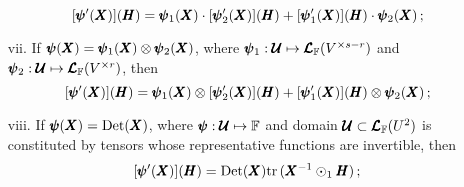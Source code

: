 \begin{itemize}
	\begin{equation}
	[\pmb{\psi}'(\pmb{X})](\pmb{H})=\pmb{\psi}_1(\pmb{X})\cdot[\pmb{\psi}_2'(\pmb{X})](\pmb{H}) + [\pmb{\psi}_1'(\pmb{X})](\pmb{H}) \cdot \pmb{\psi}_2(\pmb{X})\,;
	\end{equation}
	\item[vii.] If $\pmb{\psi}(\pmb{X})=\pmb{\psi}_1(\pmb{X})\otimes\pmb{\psi}_2(\pmb{X})$, where $\pmb{\psi}_1 : \pmb{\mathcal{U}} \mapsto \pmb{\mathcal{L}}_{\mathbb{F}}(V^{\times s-r})$ and $\pmb{\psi}_2 : \pmb{\mathcal{U}} \mapsto \pmb{\mathcal{L}}_{\mathbb{F}}(V^{\times r})$, then
\begin{equation}
[\pmb{\psi}'(\pmb{X})](\pmb{H})=\pmb{\psi}_1(\pmb{X})\otimes[\pmb{\psi}_2'(\pmb{X})](\pmb{H}) + [\pmb{\psi}_1'(\pmb{X})](\pmb{H}) \otimes \pmb{\psi}_2(\pmb{X})\,;
\end{equation}
\item[viii.] If $\pmb{\psi}(\pmb{X})=\textnormal{Det}(\pmb{X})$, where $\pmb{\psi} : \pmb{\mathcal{U}} \mapsto \mathbb{F}$ and domain $\pmb{\mathcal{U}}\subset\pmb{\mathcal{L}}_{\mathbb{F}}(U^2)$ is constituted by tensors whose representative functions are invertible, then
\begin{equation}\label{eq:derivDete}
[\pmb{\psi}'(\pmb{X})](\pmb{H})=\textnormal{Det}(\pmb{X})\mathrm{tr}\,(\pmb{X}^{-1}\odot_1\pmb{H})\,;
\end{equation}
\end{itemize}
